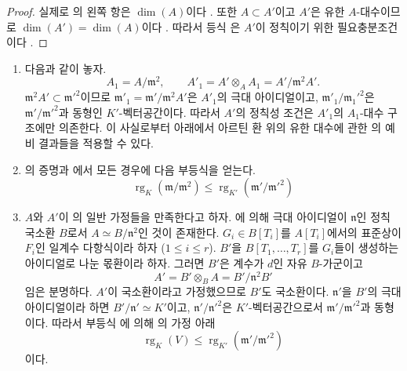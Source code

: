 \begin{proof}
실제로 의 왼쪽 항은 $\dim(A)$이다
. 또한 $A\subset A'$이고 $A'$은 유한
$A$-대수이므로 $\dim(A')=\dim(A)$이다 .
따라서 등식 은 $A'$이 정칙이기 위한
필요충분조건이다 .
\end{proof}

\begin{remark}[22.5.2]
\label{0.22.5.2-ko}
\begin{enumerate}
  \item[\rm(i)] 다음과 같이 놓자.
  \[
    A_1=A/\mathfrak m^2,\qquad
    A'_1=A'\otimes_AA_1=A'/\mathfrak m^2A'.
  \]
  $\mathfrak m^2A'\subset\mathfrak m'^2$이므로
  $\mathfrak m'_1=\mathfrak m'/\mathfrak m^2A'$은 $A'_1$의 극대
  아이디얼이고, $\mathfrak m'_1/\mathfrak m_1'^2$은
  $\mathfrak m'/\mathfrak m'^2$과 동형인 $K'$-벡터공간이다. 따라서
  $A'$의 정칙성 조건은 $A'_1$의 $A_1$-대수 구조에만 의존한다.
  이 사실로부터 아래에서 아르틴 환 위의 유한 대수에 관한
  의 예비 결과들을 적용할 수 있다.
  \item[\rm(ii)] 의 증명과
  에서 모든 경우에 다음 부등식을 얻는다.
  \begin{equation}
  \label{0.22.5.2.1-ko}
    \operatorname{rg}_K(\mathfrak m/\mathfrak m^2)
    \leqslant\operatorname{rg}_{K'}(\mathfrak m'/\mathfrak m'^2)
    \tag{22.5.2.1}
  \end{equation}


  \item[\rm(iii)] $A$와 $A'$이 의 일반 가정들을
  만족한다고 하자. 에 의해 극대 아이디얼이
  $\mathfrak n$인 정칙 국소환 $B$로서
  $A\simeq B/\mathfrak n^2$인 것이 존재한다. $G_i\in B[T_i]$를
  $A[T_i]$에서의 표준상이 $F_i$인 일계수 다항식이라 하자
  ($1\leqslant i\leqslant r$). $B'$을 $B[T_1,\ldots,T_r]$를
  $G_i$들이 생성하는 아이디얼로 나눈 몫환이라 하자. 그러면 $B'$은
  계수가 $d$인 자유 $B$-가군이고
  \[
    A'=B'\otimes_BA=B'/\mathfrak n^2B'
  \]
  임은 분명하다. $A'$이 국소환이라고 가정했으므로 $B'$도 국소환이다.
  $\mathfrak n'$을 $B'$의 극대 아이디얼이라 하면
  $B'/\mathfrak n'\simeq K'$이고,
  $\mathfrak n'/\mathfrak n'^2$은 $K'$-벡터공간으로서
  $\mathfrak m'/\mathfrak m'^2$과 동형이다. 따라서 부등식
  에 의해 의 가정 아래
  \begin{equation}
  \label{0.22.5.2.2-ko}
    \operatorname{rg}_K(V)
    \leqslant\operatorname{rg}_{K'}(\mathfrak m'/\mathfrak m'^2)
    \tag{22.5.2.2}
  \end{equation}
  이다.
\end{enumerate}
\end{remark}

